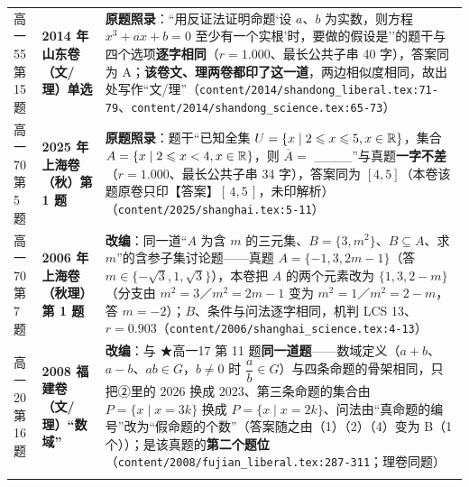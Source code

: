 \documentclass[a4paper,11pt]{article}
\begin{document}
\begin{xltabular}{\textwidth}{@{}>{\raggedright\arraybackslash}p{2.85cm}>{\raggedright\arraybackslash}p{3.99cm}>{\raggedright\arraybackslash}p{7.89cm}@{}}
高一55 第 15 题 & \textbf{2014 年山东卷（文/理）单选} & \textbf{原题照录}：``用反证法证明命题`设 \(a\)、\(b\) 为实数，则方程 \(x^3+ax+b=\allowbreak 0\) 至少有一个实根'时，要做的假设是''的题干与四个选项\textbf{逐字相同}（\(r=\allowbreak 1.000\)、最长公共子串 40 字），答案同为 A；\textbf{该卷文、理两卷都印了这一道}，两边相似度相同，故出处写作``文/理''（\texttt{content/\allowbreak{}2014/\allowbreak{}shandong\_liberal.tex:71-\allowbreak{}79}、\texttt{content/\allowbreak{}2014/\allowbreak{}shandong\_science.tex:65-\allowbreak{}73}） \\ \addlinespace[1pt]
高一70 第 5 题 & \textbf{2025 年上海卷（秋）第 1 题} & \textbf{原题照录}：题干``已知全集 \(U=\allowbreak \{x\mid\allowbreak 2\leqslant\allowbreak  x\leqslant\allowbreak 5,x\in\mathbb{R}\}\)，集合 \(A=\allowbreak \{x\mid\allowbreak 2\leqslant\allowbreak  x<4,x\in\mathbb{R}\}\)，则 \(\overline A=\allowbreak \) \_\_\_\_''与真题\textbf{一字不差}（\(r=\allowbreak 1.000\)、最长公共子串 34 字），答案同为 \([4,\allowbreak 5]\)（本卷该题原卷只印【答案】\([\,\allowbreak 4,\allowbreak 5\,\allowbreak ]\)，未印解析）（\texttt{content/\allowbreak{}2025/\allowbreak{}shanghai.tex:5-\allowbreak{}11}） \\ \addlinespace[1pt]
高一70 第 7 题 & \textbf{2006 年上海卷（秋理）第 1 题} & \textbf{改编}：同一道``\(A\) 为含 \(m\) 的三元集、\(B=\allowbreak \{3,m^2\}\)、\(B\subseteq\allowbreak  A\)、求 \(m\)''的含参子集讨论题------真题 \(A=\allowbreak \{-1,\allowbreak 3,\allowbreak 2m-1\}\)（答 \(m\in\{-\sqrt3,\allowbreak 1,\allowbreak \sqrt3\}\)），本卷把 \(A\) 的两个元素改为 \(\{1,\allowbreak 3,\allowbreak 2-m\}\)（分支由 \(m^2=\allowbreak 3\)／\(m^2=\allowbreak 2m-1\) 变为 \(m^2=\allowbreak 1\)／\(m^2=\allowbreak 2-m\)，答 \(m=\allowbreak -2\)）；\(B\)、条件与问法逐字相同，机判 LCS 13、\(r=\allowbreak 0.903\)（\texttt{content/\allowbreak{}2006/\allowbreak{}shanghai\_science.tex:4-\allowbreak{}13}） \\ \addlinespace[1pt]
高一20 第 16 题 & \textbf{2008 福建卷（文/理）``数域''} & \textbf{改编}：与 ★高一17 第 11 题\textbf{同一道题}------数域定义（\(a+b\)、\(a-b\)、\(ab\in G\)，\(b\neq0\) 时 \(\dfrac ab\in G\)）与四条命题的骨架相同，只把②里的 \(2026\) 换成 \(2023\)、第三条命题的集合由 \(P=\allowbreak \{x\mid\allowbreak  x=\allowbreak 3k\}\) 换成 \(P=\allowbreak \{x\mid\allowbreak  x=\allowbreak 2k\}\)、问法由``真命题的编号''改为``假命题的个数''（答案随之由（1）（2）（4）变为 B（1 个））；是该真题的\textbf{第二个题位}（\texttt{content/\allowbreak{}2008/\allowbreak{}fujian\_liberal.tex:287-\allowbreak{}311}；理卷同题） \\ \addlinespace[1pt]

\end{xltabular}
\end{document}

